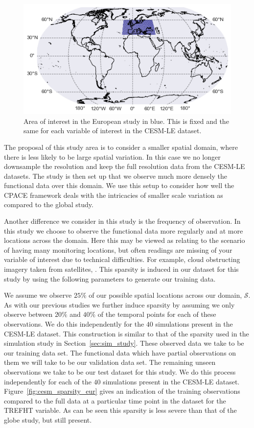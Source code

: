 \begin{figure}
	\centering
	\includegraphics[width=\textwidth]{cesm_eur_bbox}
	\caption[The area of interest in the European study.]{Area of interest in the European study in blue. This is fixed and the same for each variable of interest in the CESM-LE dataset.}
	\label{fig:cesm_eur_bbox}
\end{figure}

The proposal of this study area is to consider a smaller spatial domain, where there is less likely to be large spatial variation. 
In this case we no longer downsample the resolution and keep the full resolution data from the CESM-LE datasets.
The study is then set up that we observe much more densely the functional data over this domain.
We use this setup to consider how well the CPACE framework deals with the intricacies of smaller scale variation as compared to the global study.

Another difference we consider in this study is the frequency of observation.
In this study we choose to observe the functional data more regularly and at more locations across the domain.
Here this may be viewed as relating to the scenario of having many monitoring locations, but often readings are missing of your variable of interest due to technical difficulties.
For example, cloud obstructing imagery taken from satellites, \citep{meraner_cloud_2020}.
This sparsity is induced in our dataset for this study by using the following parameters to generate our training data.

We assume we observe $25\%$ of our possible spatial locations across our domain, $\mathcal{S}$.
As with our previous studies we further induce sparsity by assuming we only observe between $20\%$ and $40\%$ of the temporal points for each of these observations.
We do this independently for the $40$ simulations present in the CESM-LE dataset.
This construction is similar to that of the sparsity used in the simulation study in Section~\ref{sec:sim_study}.
These observed data we take to be our training data set.
The functional data which have partial observations on them we will take to be our validation data set.
The remaining unseen observations we take to be our test dataset for this study.
We do this process independently for each of the $40$ simulations present in the CESM-LE dataset.
Figure~\ref{fig:cesm_sparsity_eur} gives an indication of the training observations compared to the full data at a particular time point in the dataset for the TREFHT variable.
As can be seen this sparsity is less severe than that of the globe study, but still present.

